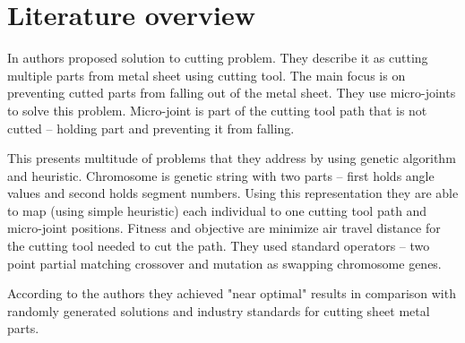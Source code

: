 \section{Literature overview}

In \cite{kandasamyEffectiveLocationMicro2020} authors proposed solution to cutting problem.
They describe it as cutting multiple parts from metal sheet using cutting tool.
The main focus is on preventing cutted parts from falling out of the metal sheet.
They use micro-joints to solve this problem. Micro-joint is part of the cutting tool
path that is not cutted – holding part and preventing it from falling.

This presents multitude of problems that they address by using genetic algorithm
and heuristic. Chromosome is genetic string with two parts – first holds
angle values and second holds segment numbers. Using this representation they are able
to map (using simple heuristic) each individual to one cutting tool path and micro-joint positions.
Fitness and objective are minimize air travel distance for the cutting tool needed to cut the
path. They used standard operators – two point partial matching crossover and mutation
as swapping chromosome genes.

According to the authors they achieved "near optimal" results in comparison with randomly
generated solutions and industry standards for cutting sheet metal parts.
